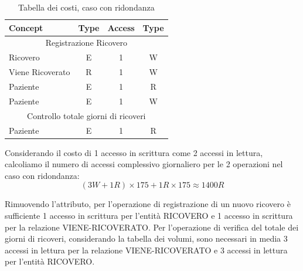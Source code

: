 \documentclass{article}
\begin{document}
\begin{table}[H]
	\centering
	\begin{tabular}{|l|c|c|c|}
		\hline
		\textbf{Concept} & \textbf{Type} & \textbf{Access} & \textbf{Type} \\ \hline
		\multicolumn{4}{|c|}{Registrazione Ricovero}                       \\ \hline
		Ricovero         & E             & 1               & W             \\ \hline
		Viene Ricoverato & R             & 1               & W             \\ \hline
		Paziente         & E             & 1               & R             \\ \hline
		Paziente         & E             & 1               & W             \\ \hline
		\multicolumn{4}{|c|}{Controllo totale giorni di ricoveri}          \\ \hline
		Paziente         & E             & 1               & R             \\ \hline
	\end{tabular}
	\caption{Tabella dei costi, caso con ridondanza}
	\label{tab:costi-attributo-ridondante}
\end{table}

Considerando il costo di 1 accesso in scrittura come 2 accessi in lettura, calcoliamo il numero di accessi complessivo giornaliero per le 2 operazioni nel caso con ridondanza:
\begin{equation}
	(3W + 1R) \times 175 + 1R \times 175 \approx 1400R
\end{equation}

Rimuovendo l'attributo, per l'operazione di registrazione di un nuovo ricovero è sufficiente 1 accesso in scrittura per l'entità RICOVERO e 1 accesso in scrittura per la relazione VIENE-RICOVERATO.
Per l'operazione di verifica del totale dei giorni di ricoveri, considerando la tabella dei volumi, sono necessari in media 3 accessi in lettura per la relazione VIENE-RICOVERATO e 3 accessi in lettura per l'entità RICOVERO.
\end{document}
